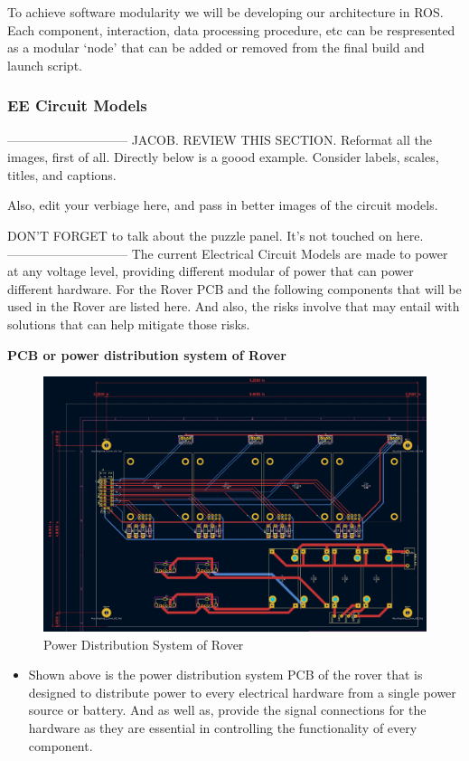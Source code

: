 \documentclass[a4paper, 10pt]{article}
\begin{document}
 	To achieve software modularity we will be developing our architecture in ROS. Each component, interaction, data processing procedure, etc can be respresented as a modular `node' that can be added or removed from the final build and launch script.
 		
 		\subsubsection{EE Circuit Models}
-----------------------------
JACOB. REVIEW THIS SECTION.	Reformat all the images, first of all. Directly below is a goood example. Consider labels, scales, titles, and captions. 

Also, edit your  verbiage here, and pass in better images of the circuit models.

DON'T FORGET to talk about the puzzle panel. It's  not touched on here.
-----------------------------
 		The current Electrical Circuit Models are made to power at any voltage level, providing different modular of power that can power different hardware. For the Rover PCB and the following components that will be used in the Rover are listed here. And also, the risks involve that may entail with solutions that can help mitigate those risks. 
 		
 	\textbf{PCB or power distribution system of Rover}

		\begin{figure} [h]
			\centering
			\includegraphics[scale=0.15]{Photos/Rover PCB}
			\caption{Power Distribution System of Rover}
		\end{figure}

\begin{itemize}
\item
	Shown above is the power distribution system PCB of the rover that is designed to distribute power to every electrical hardware from a single power source or battery. And as well as, provide the signal connections for the hardware as they are essential in controlling the functionality of every component. 
\end{itemize}
\end{document}
